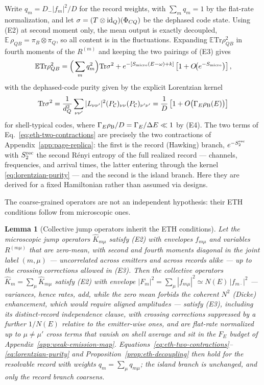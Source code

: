 \documentclass[12pt]{article}
\newcommand{\Tr}{\mathrm{Tr}}
\newcommand{\E}{\mathbb E}
\newcommand{\Smicro}{S_{\rm micro}}
\newcommand{\rhoB}{\rho_{\rm B}}
\newtheorem{lemma}{Lemma}
\begin{document}
Write $q_m=D_-|f_m|^2/D$ for the record weights, with $\sum_mq_m=1$ by the
flat-rate normalization, and let $\sigma=(T\otimes{\rm id}_Q)(\Phi_{CQ})$ be
the dephased code state.  Using (E2) at second moment only, the mean output
is exactly decoupled, $\E\,\rho_{QB}=\pi_B\otimes\pi_Q$, so all content is in
the fluctuations.  Expanding $\E\Tr\rho_{QB}^2$ in fourth moments of the
$R^{(m)}$ and keeping the two pairings of (E3) gives
\begin{equation}
    \E\Tr\rho_{QB}^2
    =
    \Big(\sum_mq_m^2\Big)\Tr\sigma^2
    +
    e^{-[\Smicro(E-\omega)+k]}
    \left[1+O\!\big(e^{-\Smicro}\big)\right],
\label{eq:eth-two-contractions}
\end{equation}
with the dephased-code purity given by the explicit Lorentzian kernel
\begin{equation}
    \Tr\sigma^2
    =
    \frac{1}{d_Q^2}
    \sum_{\nu\nu'}
    |L_{\nu\nu'}|^2
    (P_{\mathcal C})_{\nu\nu}(P_{\mathcal C})_{\nu'\nu'}
    =
    \frac{1}{D}\left[1+O\big(\Gamma_E\rhoB(E)\big)\right]
\label{eq:lorentzian-purity}
\end{equation}
for shell-typical codes, where $\Gamma_E\rhoB/D=\Gamma_E/\Delta E\ll1$ by
(E4).  The two terms of Eq.~\eqref{eq:eth-two-contractions} are precisely the
two contractions of Appendix~\ref{app:page-replica}: the first is the
record (Hawking) branch, $e^{-S_2^{\rm rec}}$ with $S_2^{\rm rec}$ the second
R\'enyi entropy of the full realized record --- channels, frequencies, and
arrival times, the latter entering through the kernel
\eqref{eq:lorentzian-purity} --- and the second is the island branch.  Here
they are derived for a fixed Hamiltonian rather than assumed via designs.

The coarse-grained operators are not an independent hypothesis: their ETH
conditions follow from microscopic ones.

\begin{lemma}[Collective jump operators inherit the ETH conditions]
\label{lem:mu-inheritance}
Let the microscopic jump operators $\widehat K_{m\mu}$ satisfy (E2) with
envelopes $f_{m\mu}$ and variables $R^{(m\mu)}$ that are zero-mean, with
second and fourth moments diagonal in the joint label $(m,\mu)$ ---
uncorrelated across emitters and across records alike --- up to the
crossing corrections allowed in (E3).  Then the collective
operators $\widehat K_m=\sum_\mu\widehat K_{m\mu}$ satisfy (E2) with
envelope $|F_m|^2=\sum_\mu|f_{m\mu}|^2\simeq N(E)\,|f_{m\cdot}|^2$ ---
variances, hence rates, add, while the zero mean forbids the coherent
$N^2$ (Dicke) enhancement, which would require aligned amplitudes ---
satisfy (E3), including its distinct-record independence clause, with
crossing corrections suppressed by a further $1/N(E)$
relative to the emitter-wise ones, and are flat-rate normalized up to
$\mu\neq\mu'$ cross terms that vanish on shell average and sit in the
$F_E$ budget of Appendix~\ref{app:weak-emission-map}.
Equations~\eqref{eq:eth-two-contractions}--\eqref{eq:lorentzian-purity}
and Proposition~\ref{prop:eth-decoupling} then hold for the resolvable
record with weights $q_m=\sum_\mu q_{m\mu}$; the island branch is
unchanged, and only the record branch coarsens.
\end{lemma}
\end{document}
